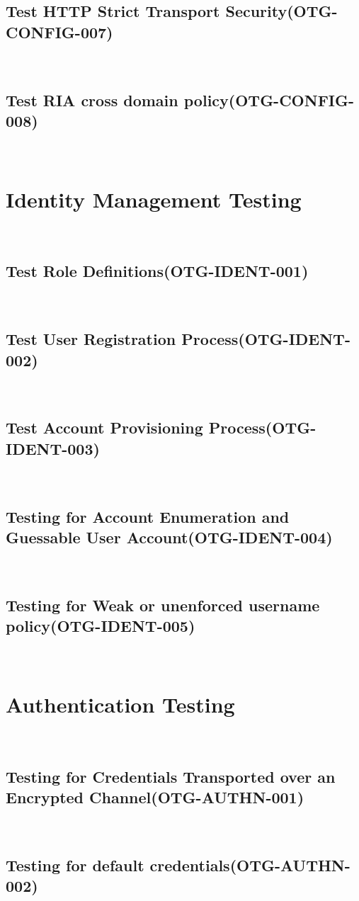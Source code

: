 \documentclass[headsepline,footsepline,footinclude=false,oneside,fontsize=11pt,paper=a4,listof=totoc,bibliography=totoc]{scrbook} %
\begin{document}
\subsection{Test HTTP Strict Transport Security(OTG-CONFIG-007)}\
\pagebreak 
\subsection{Test RIA cross domain policy(OTG-CONFIG-008)}\

 
\pagebreak 
\section{Identity Management Testing}\
\subsection{Test Role Definitions(OTG-IDENT-001)}\
\pagebreak 
\subsection{Test User Registration Process(OTG-IDENT-002)}\
\pagebreak 
\subsection{Test Account Provisioning Process(OTG-IDENT-003)}\
\pagebreak 
\subsection{Testing for Account Enumeration and Guessable User Account(OTG-IDENT-004)}\
\pagebreak 
\subsection{Testing for Weak or unenforced username policy(OTG-IDENT-005)}\
 
\pagebreak 
\section{Authentication Testing}\
\subsection{Testing for Credentials Transported over an Encrypted Channel(OTG-AUTHN-001)}\
\pagebreak 
\subsection{Testing for default credentials(OTG-AUTHN-002)}\
\pagebreak 
\end{document}
